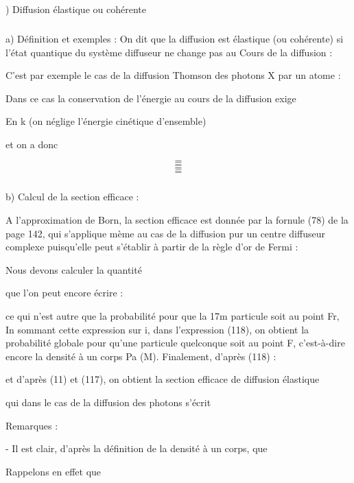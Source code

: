 {{{\subsection{}%
) Diffusion élastique ou cohérente

\subsubsection{}%
a) Définition et exemples :
On dit que la diffusion est élastique (ou cohérente) si l'état quantique du système
diffuseur ne change pas au Cours de la diffusion :

C'est par exemple le cas de la diffusion Thomson des photons X par un atome :

Dans ce cas la conservation de l'énergie au cours de la diffusion exige

 En k (on néglige l'énergie cinétique d'ensemble)

et on a donc

%
\[
\tag{117}=
\]
\[
\tag{118}=
\]
\[
\tag{119}=
\]
\[
\tag{120}=
\]

\subsubsection{}%
b) Calcul de la section efficace :

A l'approximation de Born, la section efficace est donnée par
la fornule (78) de la page 142, qui s'applique mème au cas de la diffusion
pur un centre diffuseur complexe puisqu'elle peut s'établir à partir de la
règle d'or de Fermi :

Nous devons calculer la quantité

que l'on peut encore écrire :

ce qui n'est autre que la probabilité pour que la 17m particule soit au point
Fr, In sommant cette expression sur i, dans l'expression (118), on obtient la
probabilité globale pour qu'une particule quelconque soit au point F, c'est-à-dire
encore la densité à un corps Pa (M). Finalement, d'après (118) :

et d'après (11) et (117), on obtient la section efficace de diffusion élastique

qui dans le cas de la diffusion des photons s'écrit


Remarques :

- Il est clair, d'après la définition de la densité à un corps, que

 Rappelons en effet que

}}}

